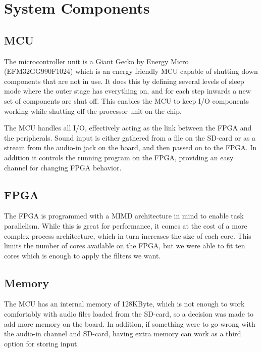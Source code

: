 
\section{System Components}

\subsection{MCU} The microcontroller unit is a Giant Gecko by Energy Micro
(EFM32GG990F1024) which is an energy friendly MCU capable of shutting down
components that are not in use. It does this by defining several levels of sleep
mode where the outer stage has everything on, and for each step inwards a new
set of components are shut off. This enables the MCU to keep I/O components working while shutting off
the processor unit on the chip.

The MCU handles all I/O, effectively acting as the link between the FPGA and the
peripherals. Sound input is either gathered from a file on the SD-card or as a
stream from the audio-in jack on the board, and then passed on to the FPGA. In
addition it controls the running program on the FPGA, providing an easy channel
for changing FPGA behavior.

\subsection{FPGA} The FPGA is programmed with a MIMD architecture in mind to
enable task parallelism. While this is great for performance, it comes at the
cost of a more complex process architecture, which in turn increases the size of
each core. This limits the number of cores available on the FPGA, but we were
able to fit ten cores which is enough to apply
the filters we want.

\subsection{Memory} The MCU has an internal memory of 128KByte, which is not
enough to work comfortably with audio files loaded from the SD-card, so a
decision was made to add more memory on the board. In addition, if something
were to go wrong with the audio-in channel and SD-card, having extra memory can
work as a third option for storing input.

